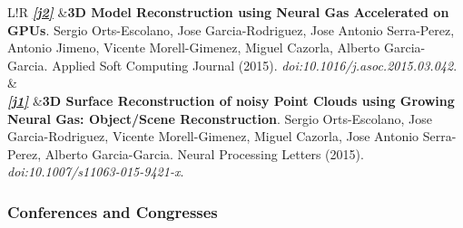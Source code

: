 \documentclass[8pt]{article}
\newcommand\VRule{\color{lightgray}\vrule width 0.5pt}
\begin{document}
\begin{tabular}{L!{\VRule}R}
	\emph{\textbf{\href{http://www.sciencedirect.com/science/article/pii/S1568494615002008}{[j2]}}} &\textbf{3D Model Reconstruction using Neural Gas Accelerated on GPUs}. Sergio Orts-Escolano, Jose Garcia-Rodriguez, Jose Antonio Serra-Perez, Antonio Jimeno, Vicente Morell-Gimenez, Miguel Cazorla, Alberto Garcia-Garcia. Applied Soft Computing Journal (2015). \emph{doi:10.1016/j.asoc.2015.03.042}.\\
	& \\
	\emph{\textbf{\href{http://link.springer.com/article/10.1007/s11063-015-9421-x}{[j1]}}} &\textbf{3D Surface Reconstruction of noisy Point Clouds using Growing Neural Gas: Object/Scene Reconstruction}. Sergio Orts-Escolano, Jose Garcia-Rodriguez, Vicente Morell-Gimenez, Miguel Cazorla, Jose Antonio Serra-Perez, Alberto Garcia-Garcia. Neural Processing Letters (2015). \emph{doi:10.1007/s11063-015-9421-x}. \\
\end{tabular}

\subsubsection*{Conferences and Congresses}
\end{document}
